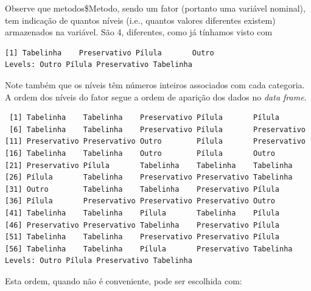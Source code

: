 \documentclass[
]{article}
\newenvironment{Shaded}{\begin{snugshade}}{\end{snugshade}}
\newcommand{\AttributeTok}[1]{\textcolor[rgb]{0.77,0.63,0.00}{#1}}
\newcommand{\FunctionTok}[1]{\textcolor[rgb]{0.00,0.00,0.00}{#1}}
\newcommand{\NormalTok}[1]{#1}
\newcommand{\OtherTok}[1]{\textcolor[rgb]{0.56,0.35,0.01}{#1}}
\newcommand{\SpecialCharTok}[1]{\textcolor[rgb]{0.00,0.00,0.00}{#1}}
\newcommand{\StringTok}[1]{\textcolor[rgb]{0.31,0.60,0.02}{#1}}
\begin{document}
Observe que metodos\$Metodo, sendo um fator (portanto uma variável
nominal), tem indicação de quantos níveis (i.e., quantos valores
diferentes existem) armazenados na variável. São 4, diferentes, como já
tínhamos visto com

\begin{Shaded}
\end{Shaded}

\begin{verbatim}
[1] Tabelinha    Preservativo Pílula       Outro       
Levels: Outro Pílula Preservativo Tabelinha
\end{verbatim}

Note também que os níveis têm números inteiros associados com cada
categoria. A ordem dos níveis do fator segue a ordem de aparição dos
dados no \emph{data frame}.

\begin{Shaded}
\end{Shaded}

\begin{verbatim}
 [1] Tabelinha    Tabelinha    Preservativo Pílula       Pílula      
 [6] Tabelinha    Tabelinha    Preservativo Pílula       Preservativo
[11] Preservativo Preservativo Outro        Pílula       Preservativo
[16] Tabelinha    Tabelinha    Outro        Pílula       Outro       
[21] Preservativo Pílula       Tabelinha    Tabelinha    Tabelinha   
[26] Pílula       Tabelinha    Preservativo Preservativo Tabelinha   
[31] Outro        Tabelinha    Tabelinha    Preservativo Pílula      
[36] Pílula       Preservativo Preservativo Preservativo Outro       
[41] Tabelinha    Tabelinha    Pílula       Tabelinha    Pílula      
[46] Preservativo Preservativo Tabelinha    Preservativo Pílula      
[51] Tabelinha    Tabelinha    Preservativo Preservativo Pílula      
[56] Tabelinha    Tabelinha    Pílula       Preservativo Tabelinha   
Levels: Outro Pílula Preservativo Tabelinha
\end{verbatim}

Esta ordem, quando não é conveniente, pode ser escolhida com:

\begin{Shaded}
\end{Shaded}
\end{document}
